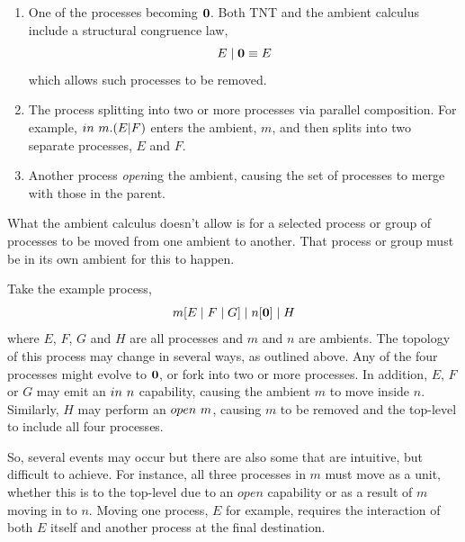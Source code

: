 \begin{enumerate}
\item One of the processes becoming $\textbf{0}$.  Both TNT and the ambient
      calculus include a structural congruence law,
\begin{equation}
E\;|\;\textbf{0} \equiv E
\end{equation}
      which allows such processes to be removed.
\item The process splitting into two or more processes via parallel
      composition.  For example, $in\ m.(E | F)$ enters the ambient, $m$,
      and then splits into two separate processes, $E$ and $F$.
\item Another process \emph{open}ing the ambient, causing the set of
      processes to merge with those in the parent.
\end{enumerate}

What the ambient calculus doesn't allow is for a selected process or
group of processes to be moved from one ambient to another.  That
process or group must be in its own ambient for this to happen.

Take the example process, 
\begin{equation}
m[E\;|\;F\;|\;G]\;|\;n[\textbf{0}]\;|\;H
\end{equation}
where $E$, $F$, $G$ and $H$ are all processes and $m$ and $n$
are ambients.  The topology of this process may change in several ways, as
outlined above. Any of the four processes might evolve to $\textbf{0}$, or fork
into two or more processes.  In addition, $E$, $F$ or $G$ may emit an
$in\ n$ capability, causing the ambient $m$ to move inside $n$.
Similarly, $H$ may perform an $open\ m$, causing $m$ to be removed and
the top-level to include all four processes.

So, several events may occur but there are also some that are intuitive,
but difficult to achieve.  For instance, all three processes in $m$ must
move as a unit, whether this is to the top-level due to an $open$
capability or as a result of $m$ moving in to $n$.  Moving one process,
$E$ for example, requires the interaction of both $E$ itself and another
process at the final destination.

